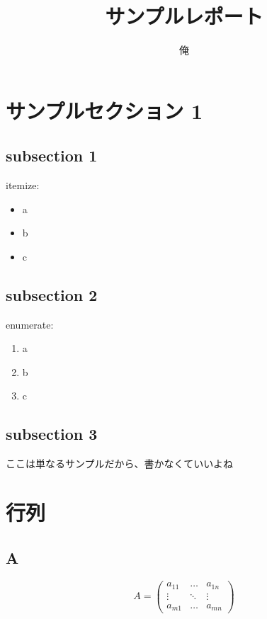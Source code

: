 \documentclass{jsarticle} %
\begin{document}
	\begin{titlepage}
		\title{サンプルレポート}
		\author{俺}
		\maketitle
		\thispagestyle{empty}
	\end{titlepage}

	
    
	\section{サンプルセクション 1}
        		\subsection{subsection 1}
            	itemize: 
            
                \begin{itemize}
                    	\item a
                    	\item b
                    	\item c
                \end{itemize}
	\subsection{subsection 2}
        		enumerate:
		
		\begin{enumerate}
			\item a
			\item b
			\item c \cite{A}
		\end{enumerate}
        \subsection{subsection 3}
		ここは単なるサンプルだから、書かなくていいよね
    
	\section{行列}
		\subsection{A}
			\begin{equation*}
				A = 
				\begin{pmatrix}
					a_{11} & \ldots & a_{1n} \\
					\vdots & \ddots & \vdots \\
					a_{m1} & \ldots & a_{mn}
				\end{pmatrix}
			\end{equation*}
			
\end{document}
